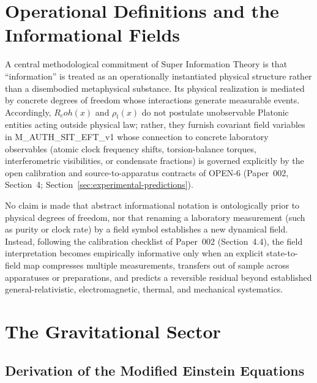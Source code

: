 \documentclass[american,11pt,letterpaper]{article}
\newcommand{\Rcoh}{R_{\mathrm{coh}}}
\def\mathrm#1{#1}%
\def\texttt#1{#1}%
\def\Rcoh{R_coh}%
\begin{document}
\section{Operational Definitions and the Informational Fields}
\label{sec:operational-definitions}

A central methodological commitment of Super Information Theory is that ``information'' is treated as an operationally instantiated physical structure rather than a disembodied metaphysical substance. Its physical realization is mediated by concrete degrees of freedom whose interactions generate measurable events. Accordingly, $\Rcoh(x)$ and $\rho_t(x)$ do not postulate unobservable Platonic entities acting outside physical law; rather, they furnish covariant field variables in \texttt{M\_AUTH\_SIT\_EFT\_v1} whose connection to concrete laboratory observables (atomic clock frequency shifts, torsion-balance torques, interferometric visibilities, or condensate fractions) is governed explicitly by the open calibration and source-to-apparatus contracts of \texttt{OPEN-6} (Paper~002, Section~4; Section~\ref{sec:experimental-predictions}).

No claim is made that abstract informational notation is ontologically prior to physical degrees of freedom, nor that renaming a laboratory measurement (such as purity or clock rate) by a field symbol establishes a new dynamical field. Instead, following the calibration checklist of Paper~002 (Section~4.4), the field interpretation becomes empirically informative only when an explicit state-to-field map compresses multiple measurements, transfers out of sample across apparatuses or preparations, and predicts a reversible residual beyond established general-relativistic, electromagnetic, thermal, and mechanical systematics.
\section{The Gravitational Sector}
\label{sec:gravitational-sector}

\subsection{Derivation of the Modified Einstein Equations}
\end{document}
